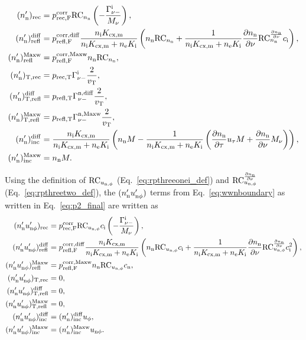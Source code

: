 \begin{align}
    (\nn')_{\mathrm{rec}} & = \pcorfi \rptwoonei \left( - \frac{\fdni}{\ionel} \right), \\
    (\nn')_{\mathrm{refl}}^{\mathrm{diff}} & = \pcorfnd \frac{\vcx}{\vtot} \left( \nn \rptwoonei + \frac{1}{\vtot} \dnndz \rptwotwoi \ci \right), \\
    (\nn')_{\mathrm{refl}}^{\mathrm{Maxw}} & = \pcorfnm \nn \rptwoonei, \\
     (\nn')_{\mathrm{T,rec}} & = \pti \fdni \frac{2}{\vT}, \\
    (\nn')_{\mathrm{T,refl}}^{\mathrm{diff}} & = \ptn \fnnid \frac{2}{\vT}, \\
    (\nn')_{\mathrm{T,refl}}^{\mathrm{Maxw}} & = \ptn \fnnim \frac{2}{\vT}, \\
    (\nn')_{\mathrm{inc}}^{\mathrm{diff}} & = \frac{\vcx}{\vtot} \left( \nn \izerol - \frac{1}{\vtot} \left( \dnndy \uy \izerol + \dnndz \ionel \right) \right), \\
    (\nn')_{\mathrm{inc}}^{\mathrm{Maxw}} & = \nn \izerol. \\
\end{align}

Using the definition of $\rpthreeonei$ (Eq.~\eqref{eq:rpthreeonei_def}) and $\rpthreetwoi$ (Eq.~\eqref{eq:rpthreetwo_def}), the $(\nn' \wwn')$ terms from Eq.~\eqref{eq:wwnboundary} as written in Eq.~\eqref{eq:p2_final} are written as
\begin{align}
    (\nn' \wwn')_{\mathrm{rec}} & = \pcorfi \rpthreeonei \ci \left( - \frac{\fdni}{\ionel} \right), \\
    (\nn' \wwn')_{\mathrm{refl}}^{\mathrm{diff}} & = \pcorfnd \frac{\vcx}{\vtot} \left( \nn \rpthreeonei \ci + \frac{1}{\vtot} \dnndz \rpthreetwoi \ci^2 \right), \\
    (\nn' \wwn')_{\mathrm{refl}}^{\mathrm{Maxw}} & = \pcorfnm \nn \rpthreeonei \cn, \\
    (\nn' \wwn')_{\mathrm{T,rec}} & = 0, \\
    (\nn' \wwn')_{\mathrm{T,refl}}^{\mathrm{diff}} & = 0, \\
    (\nn' \wwn')_{\mathrm{T,refl}}^{\mathrm{Maxw}} & = 0, \\
    (\nn' \wwn')_{\mathrm{inc}}^{\mathrm{diff}} & = (\nn')_{\mathrm{inc}}^{\mathrm{diff}} \ux, \\
    (\nn' \wwn')_{\mathrm{inc}}^{\mathrm{Maxw}} & = (\nn')_{\mathrm{inc}}^{\mathrm{Maxw}} \uxn.
\end{align}

